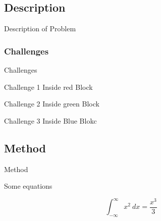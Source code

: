 \subsection{Description}

\begin{frame}{Description of Problem}
    \lipsum[1]    
\end{frame}

\subsubsection{Challenges}

\begin{frame}{Challenges}
    \begin{redblock}{Challenge 1}
        Inside red Block
    \end{redblock}
    
    \begin{greenblock}{Challenge 2}
        Inside green Block
    \end{greenblock}
    
    \begin{blueblock}{Challenge 3}
    Inside Blue Blokc
    \end{blueblock}
    
\end{frame}

\subsection{Method}

\begin{frame}{Method}

Some equations

\begin{equation}
    \displaystyle\int^\infty_{-\infty} x^2 ~dx = \frac{x^3}{3}
\end{equation}


\end{frame}